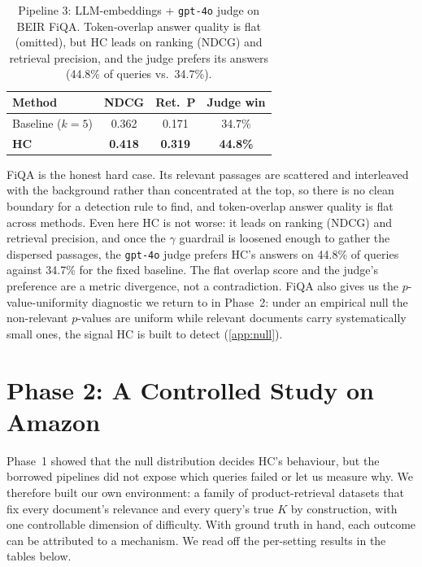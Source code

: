 \documentclass[letterpaper]{article}
\newcommand{\FqBaseNDCG}{0.362}\newcommand{\FqHCNDCG}{0.418}
\newcommand{\FqBasePre}{0.171}\newcommand{\FqHCPre}{0.319}
\newcommand{\FqJudgeWin}{44.8}\newcommand{\FqJudgeLose}{34.7}
\begin{document}
\begin{table}[t]
\centering\small
\setlength{\extrarowheight}{1.5pt}
\begin{tabular}{|l|c|c|c|}
\hline
\textbf{Method} & \textbf{NDCG} & \textbf{Ret.\ P} & \textbf{Judge win} \\
\hline
Baseline ($k{=}5$) & \FqBaseNDCG & \FqBasePre & \FqJudgeLose\% \\
\hline
\textbf{HC} & \textbf{\FqHCNDCG} & \textbf{\FqHCPre} & \textbf{\FqJudgeWin\%} \\
\hline
\end{tabular}
\caption{Pipeline 3: LLM-embeddings + \texttt{gpt-4o} judge on BEIR FiQA.
Token-overlap answer quality is flat (omitted), but HC leads on ranking
(NDCG) and retrieval precision, and the judge prefers its answers
(\FqJudgeWin\% of queries vs.\ \FqJudgeLose\%).}
\label{tab:p1c}
\end{table}

FiQA is the honest hard case. Its relevant passages are scattered and
interleaved with the background rather than concentrated at the top, so
there is no clean boundary for a detection rule to find, and token-overlap
answer quality is flat across methods. Even here HC is not worse: it
leads on ranking (NDCG) and retrieval precision, and once the $\gamma$
guardrail is loosened enough to gather the dispersed passages, the
\texttt{gpt-4o} judge prefers HC's answers on \FqJudgeWin\% of queries
against \FqJudgeLose\% for the fixed baseline. The flat overlap score and
the judge's preference are a metric divergence, not a contradiction.
FiQA also gives us the $p$-value-uniformity diagnostic we return to in
Phase~2: under an empirical null the non-relevant $p$-values are uniform
while relevant documents carry systematically small ones, the signal HC
is built to detect (\ref{app:null}).

\section{Phase 2: A Controlled Study on Amazon}
\label{sec:amazon}
Phase~1 showed that the null distribution decides HC's behaviour, but the
borrowed pipelines did not expose which queries failed or let us measure
why. We therefore built our own environment: a family of product-retrieval
datasets that fix every document's relevance and every query's true $K$ by
construction, with one controllable dimension of difficulty. With ground
truth in hand, each outcome can be attributed to a mechanism. We read off the
per-setting results in the tables below.
\end{document}

